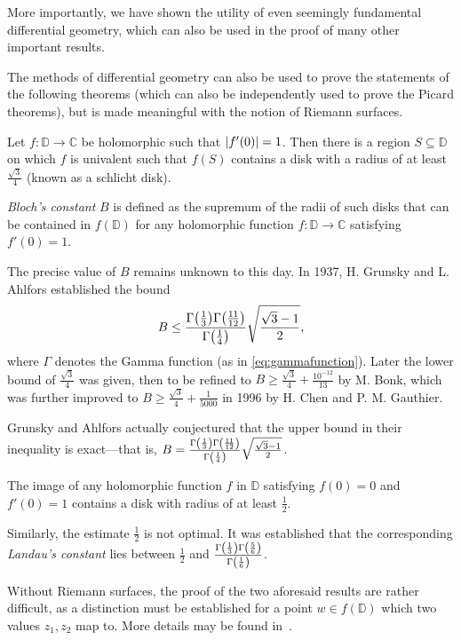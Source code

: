 More importantly, we have shown the utility of even seemingly fundamental differential geometry, which can also be used in the proof of many other important results.

The methods of differential geometry can also be used to prove the statements of the following theorems (which can also be independently used to prove the Picard theorems), but is made meaningful with the notion of Riemann surfaces.
\begin{theorem}[name=\textsc{Bloch}]\label{thm:bloch}
    Let \(f:\mathbb{D}\to\mathbb{C}\) be holomorphic such that \(\abs{f'(0)}=1\). Then there is a region \(S\subseteq\mathbb{D}\) on which \(f\) is univalent such that \(f(S)\) contains a disk with a radius of at least \(\frac{\sqrt{3}}{4}\) (known as a schlicht disk).
\end{theorem}
\begin{remark}
    \textit{Bloch's constant} \(B\) is defined as the supremum of the radii of such disks that can be contained in \(f(\mathbb{D})\) for any holomorphic function \(f:\mathbb{D}\to\mathbb{C}\) satisfying \(f'(0)=1\).

    The precise value of \(B\) remains unknown to this day. In 1937, H. Grunsky and L. Ahlfors established the bound
    \[B\leq\frac{\Gamma\qty(\frac{1}{3})\Gamma\qty(\frac{11}{12})}{\Gamma\qty(\frac{1}{4})}\sqrt{\frac{\sqrt{3}-1}{2}},\]
    where \(\Gamma\) denotes the Gamma function (as in \cref{eq:gammafunction}). Later the lower bound of \(\frac{\sqrt{3}}{4}\) was given, then to be refined to \(B\geq\frac{\sqrt{3}}{4}+\frac{10^{-12}}{13}\) by M. Bonk, which was further improved to \(B\geq\frac{\sqrt{3}}{4}+\frac{1}{5000}\) in 1996 by H. Chen and P. M. Gauthier.

    Grunsky and Ahlfors actually conjectured that the upper bound in their inequality is exact---that is, \(B=\frac{\Gamma\qty(\frac{1}{3})\Gamma\qty(\frac{11}{12})}{\Gamma\qty(\frac{1}{4})}\sqrt{\frac{\sqrt{3}-1}{2}}\).
\end{remark}
\begin{theorem}
    The image of any holomorphic function \(f\) in \(\mathbb{D}\) satisfying \(f(0)=0\) and \(f'(0)=1\) contains a disk with radius of at least \(\frac12\).
\end{theorem}
\begin{remark}
    Similarly, the estimate \(\frac12\) is not optimal. It was established that the corresponding \textit{Landau's constant} lies between \(\frac12\) and \(\frac{\Gamma\qty(\frac13)\Gamma\qty(\frac56)}{\Gamma\qty(\frac16)}\).
\end{remark}
Without Riemann surfaces, the proof of the two aforesaid results are rather difficult, as a distinction must be established for a point \(w\in f(\mathbb{D})\) which two values \(z_1,z_2\) map to. More details may be found in~\cite{ahlforsanextensionofschwarzlemma}.

